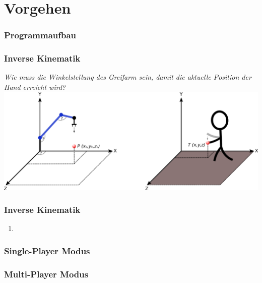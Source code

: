 \section{Vorgehen}

\begin{frame}
  \frametitle{Programmaufbau}
\end{frame}
 
 
 
 
 

\begin{frame}
\frametitle{Inverse Kinematik}
\textit{Wie muss die Winkelstellung des Greifarm sein, damit die aktuelle Position der Hand erreicht wird?}\\
\vspace*{1cm}
\includegraphics[width=\textwidth]{imgs/kinematikProblem.png}
\end{frame}

\begin{frame}
\frametitle{Inverse Kinematik}
\begin{enumerate}
\item 
\end{enumerate}



\end{frame}



\begin{frame}
  \frametitle{Single-Player Modus}

\end{frame}

\begin{frame}
  \frametitle{Multi-Player Modus}

\end{frame}